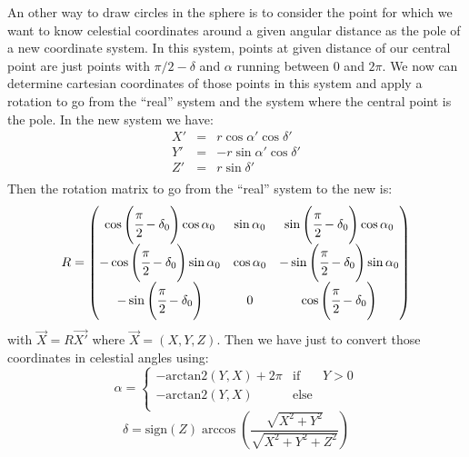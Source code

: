 An other way to draw circles in the sphere is to consider the point for which
we want to know celestial coordinates around a given angular distance as the
pole of a new coordinate system. In this system, points at given distance of
our central point are just points with $\pi/2-\delta$ and $\alpha$ running
between 0 and $2\pi$. We now can determine cartesian coordinates of
those points in this system and apply a rotation to go from the ``real'' system
and the system where the central point is the pole. In the new system we have:
%
\begin{eqnarray}
        X'&=&r\cos\alpha'\cos\delta' \nonumber\\
        Y'&=&-r\sin\alpha'\cos\delta' \nonumber\\
        Z'&=&r\sin\delta' \nonumber\\
\end{eqnarray}
%
Then the rotation matrix to go from the ``real'' system to the new is:
%
\begin{equation}
    R =
    \begin{pmatrix}
    \cos\left(\cfrac{\pi}{2}-\delta_0\right)\cos\alpha_0 & \sin\alpha_0 & \sin\left(\cfrac{\pi}{2}-\delta_0\right)\cos\alpha_0 \\
    -\cos\left(\cfrac{\pi}{2}-\delta_0\right)\sin\alpha_0 & \cos\alpha_0 & -\sin\left(\cfrac{\pi}{2}-\delta_0\right)\sin\alpha_0 \\
    -\sin\left(\cfrac{\pi}{2}-\delta_0\right) & 0 & \cos\left(\cfrac{\pi}{2}-\delta_0\right) \\
    \end{pmatrix}
\end{equation}
%
with $\vec{X}=R\vec{X'}$ where $\vec{X}=(X,Y,Z)$. Then we have just to convert
those coordinates in celestial angles using:
%
\begin{equation}
        \alpha=\left\{ \begin{array}{lcr}
                         -\mbox{arctan2}(Y,X)+2\pi & \mbox{if} & Y>0 \\
                         -\mbox{arctan2}(Y,X) & \mbox{else} & \\
                        \end{array}\right.\nonumber%
\end{equation}
%
\begin{equation}
        \delta=\mbox{sign}(Z)\arccos\left(\frac{\sqrt{X^2+Y^2}}{\sqrt{X^2+Y^2+Z^2}}\right)
\end{equation}
%
